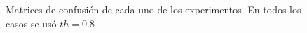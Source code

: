 \begin{figure}
	\caption{ Matrices de confusión de cada uno de los experimentos. En todos los casos se usó $th=0.8$} \label{fig:cm-comparison}
\end{figure} 

